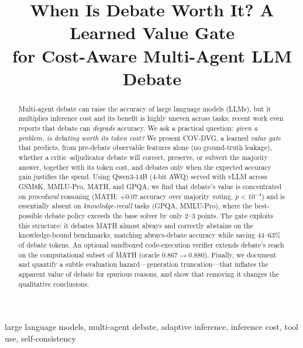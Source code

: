 \documentclass[conference]{IEEEtran}
\begin{document}
\title{When Is Debate Worth It? A Learned Value Gate\\ for Cost-Aware Multi-Agent LLM Debate}

\author{
}

\maketitle

\begin{abstract}
Multi-agent debate can raise the accuracy of large language models (LLMs), but it
multiplies inference cost and its benefit is highly uneven across tasks; recent work
even reports that debate can \emph{degrade} accuracy. We ask a practical question:
\emph{given a problem, is debating worth its token cost?} We present COV-DVG, a
learned \emph{value gate} that predicts, from pre-debate observable features alone
(no ground-truth leakage), whether a critic--adjudicator debate will correct,
preserve, or subvert the majority answer, together with its token cost, and debates
only when the expected accuracy gain justifies the spend. Using Qwen3-14B (4-bit
AWQ) served with vLLM across GSM8K, MMLU-Pro, MATH, and GPQA, we find that debate's
value is concentrated on \emph{procedural} reasoning (MATH: $+0.07$ accuracy over
majority voting, $p<10^{-4}$) and is essentially absent on \emph{knowledge-recall}
tasks (GPQA, MMLU-Pro), where the best-possible debate policy exceeds the base solver
by only $2$--$3$ points. The gate exploits this structure: it debates MATH almost
always and correctly abstains on the knowledge-bound benchmarks, matching
always-debate accuracy while saving $44$--$63\%$ of debate tokens. An optional
sandboxed code-execution verifier extends debate's reach on the computational subset
of MATH (oracle $0.867\!\rightarrow\!0.880$). Finally, we document and quantify a
subtle evaluation hazard---generation truncation---that inflates the apparent value
of debate for spurious reasons, and show that removing it changes the qualitative
conclusions.
\end{abstract}

\begin{IEEEkeywords}
large language models, multi-agent debate, adaptive inference, inference cost,
tool use, self-consistency
\end{IEEEkeywords}
\end{document}
